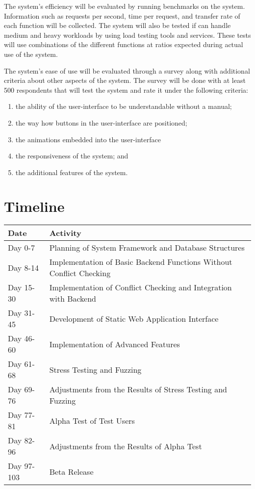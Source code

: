 \documentclass{sigchi}
\begin{document}
The system's efficiency will be evaluated by running benchmarks on the system.
Information such as requests per second, time per request, and transfer rate
of each function will be collected. The system will also be tested if can 
handle medium and heavy workloads by using load testing tools and services.
These tests will use combinations of the different functions at ratios expected
during actual use of the system. 

The system's ease of use will be evaluated through a survey along with additional
criteria about other aspects of the system.
The survey will be done with at least 500 respondents that will test the system
and rate it under the following criteria:
\begin{enumerate}
 \item the ability of the user-interface to be understandable without a manual;
 \item the way how buttons in the user-interface are positioned;
 \item the animations embedded into the user-interface
 \item the responsiveness of the system; and
 \item the additional features of the system.
\end{enumerate}

\section{Timeline}
\begin{center}
    \begin{tabular}{ | l | p{5cm} |}
    \hline
      Date & Activity \\ \hline
      Day 0-7 & Planning of System Framework and Database Structures \\ \hline
      Day 8-14 & Implementation of Basic Backend Functions Without Conflict Checking \\ \hline
      Day 15-30 & Implementation of Conflict Checking and Integration with Backend \\ \hline
      Day 31-45 & Development of Static Web Application Interface \\ \hline
      Day 46-60 & Implementation of Advanced Features \\ \hline
      Day 61-68 & Stress Testing and Fuzzing \\ \hline
      Day 69-76 & Adjustments from the Results of Stress Testing and Fuzzing \\ \hline
      Day 77-81 & Alpha Test of Test Users \\ \hline
      Day 82-96 & Adjustments from the Results of Alpha Test \\ \hline
      Day 97-103 & Beta Release \\ \hline
    \end{tabular}
\end{center}




\end{document}
